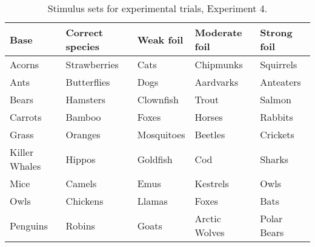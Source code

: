 \setlength\LTleft{0cm}
\setlength\LTright{0cm}

\FloatBarrier


\begin{table}[!h]
  \centering
  \caption[]{Stimulus sets for experimental trials, Experiment 4.
    \label{tbl:exp4-species}
  }
  \begin{tabular}{lllll}
    \toprule
    Base          & Correct species  & Weak foil  & Moderate foil & Strong foil        \\
    \midrule
    Acorns        & Strawberries     & Cats       & Chipmunks     & Squirrels    \\
    Ants          & Butterflies      & Dogs       & Aardvarks     & Anteaters    \\
    Bears         & Hamsters         & Clownfish  & Trout         & Salmon        \\
    Carrots       & Bamboo           & Foxes      & Horses        & Rabbits      \\
    Grass         & Oranges          & Mosquitoes & Beetles       & Crickets     \\
    Killer Whales & Hippos           & Goldfish   & Cod           & Sharks       \\
    Mice          & Camels           & Emus       & Kestrels      & Owls         \\
    Owls          & Chickens         & Llamas     & Foxes         & Bats         \\
    Penguins      & Robins           & Goats      & Arctic Wolves & Polar Bears  \\
    \bottomrule
  \end{tabular}
\end{table}










